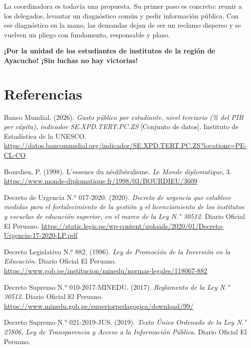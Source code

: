 \documentclass[
  jou,
  floatsintext,
  longtable,
  a4paper,
  nolmodern,
  notxfonts,
  notimes,
  12pt,
  colorlinks=true,linkcolor=blue,citecolor=blue,urlcolor=blue]{apa7}
\newlength{\cslhangindent}
\newenvironment{CSLReferences}[2] %
 {\begin{list}{}{%
  \setlength{\itemindent}{0pt}
  \setlength{\leftmargin}{0pt}
  \setlength{\parsep}{0pt}
  \ifodd #1
   \setlength{\leftmargin}{\cslhangindent}
   \setlength{\itemindent}{-1\cslhangindent}
  \fi
  \setlength{\itemsep}{#2\baselineskip}}}
 {\end{list}}
\begin{document}
La coordinadora es todavía una propuesta. Su primer paso es concreto:
reunir a los delegados, levantar un diagnóstico común y pedir
información pública. Con ese diagnóstico en la mano, las demandas dejan
de ser un reclamo disperso y se vuelven un pliego con fundamento,
responsable y plazo.

\textbf{¡Por la unidad de los estudiantes de institutos de la región de
Ayacucho! ¡Sin luchas no hay victorias!}

\section{Referencias}\label{referencias}

\protect{}\label{refs}
\begin{CSLReferences}{1}{0}
Banco Mundial. (2026). \emph{Gasto público por estudiante, nivel
terciario (\% del {PIB} per cápita), indicador {SE.XPD.TERT.PC.ZS}}
{[}Conjunto de datos{]}. Instituto de Estadística de la UNESCO.
\url{https://datos.bancomundial.org/indicador/SE.XPD.TERT.PC.ZS?locations=PE-CL-CO}

Bourdieu, P. (1998). L'essence du néolibéralisme. \emph{Le Monde
diplomatique}, 3.
\url{https://www.monde-diplomatique.fr/1998/03/BOURDIEU/3609}

Decreto de Urgencia N.° 017-2020. (2020). \emph{Decreto de urgencia que
establece medidas para el fortalecimiento de la gestión y el
licenciamiento de los institutos y escuelas de educación superior, en el
marco de la Ley N.° 30512}. Diario Oficial El Peruano.
\url{https://static.legis.pe/wp-content/uploads/2020/01/Decreto-Urgencia-17-2020-LP.pdf}

Decreto Legislativo N.° 882. (1996). \emph{Ley de Promoción de la
Inversión en la Educación}. Diario Oficial El Peruano.
\url{https://www.gob.pe/institucion/minedu/normas-legales/118067-882}

Decreto Supremo N.° 010-2017-MINEDU. (2017). \emph{Reglamento de la Ley
N.° 30512}. Diario Oficial El Peruano.
\url{https://www.minedu.gob.pe/superiorpedagogica/download/99/}

Decreto Supremo N.° 021-2019-JUS. (2019). \emph{Texto Único Ordenado de
la Ley N.° 27806, Ley de Transparencia y Acceso a la Información
Pública}. Diario Oficial El Peruano.


\end{CSLReferences}
\end{document}
